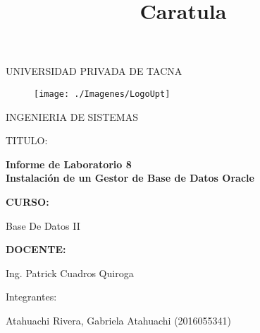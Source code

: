 \documentclass[12pt, letterpaper]{article}
\begin{document}
\title{Caratula}

\begin{titlepage}
	\begin{center}
		\large{UNIVERSIDAD PRIVADA DE TACNA}\\

		\vspace*{-0.025in}
			\begin{figure}[htb]
				\begin{center}
					\texttt{[image: ./Imagenes/LogoUpt]}
				\end{center}
			\end{figure}

		\vspace*{0.15in}
		INGENIERIA DE SISTEMAS  \\

		\vspace*{0.5in}
			\begin{large}
			TITULO:\\
			\end{large}

		\vspace*{0.1in}
			\begin{large}
				\textbf{Informe de Laboratorio 8} \\
				\textbf{Instalación de un Gestor de Base de Datos Oracle} \\
			\end{large}

		\vspace*{0.3in}
			\begin{large}
				\textbf{CURSO:} \\
			\end{large}

		\vspace*{0.1in}
			\begin{large}
				Base De Datos II \\
			\end{large}

		\vspace*{0.3in}
			\begin{large}
				\textbf{DOCENTE:} \\
			\end{large}

		\vspace*{0.1in}
			\begin{large}
				Ing. Patrick Cuadros Quiroga \\
			\end{large}

		\vspace*{0.2in}
			\vspace*{0.1in}
				\begin{large}
					Integrantes: \\
					\begin{flushleft}
						Atahuachi Rivera, Gabriela Atahuachi	\hfill	(2016055341) \\
					\end{flushleft}
				\end{large}
	\end{center}
\end{titlepage}
\end{document}

